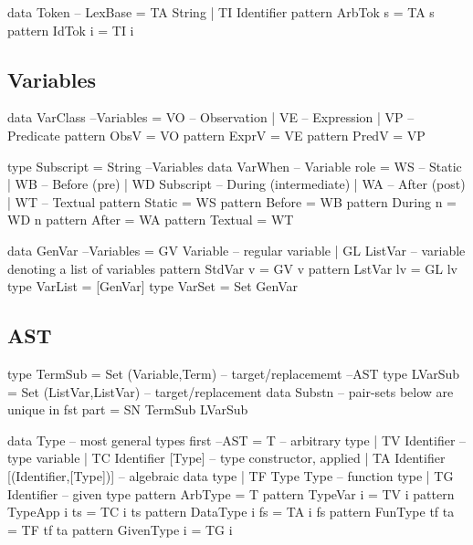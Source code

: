 \begin{code}
data Token                                                         -- LexBase
 = TA String
 | TI Identifier
pattern ArbTok s = TA s
pattern IdTok i = TI i
\end{code}

\subsection{Variables}

\begin{code}
data VarClass                                                     --Variables
  = VO -- Observation
  | VE -- Expression
  | VP -- Predicate
pattern ObsV  = VO
pattern ExprV = VE
pattern PredV = VP
\end{code}

\begin{code}
type Subscript = String                                           --Variables
data VarWhen -- Variable role
  = WS            --  Static
  | WB            --  Before (pre)
  | WD Subscript  --  During (intermediate)
  | WA            --  After (post)
  | WT            --  Textual
pattern Static    =  WS
pattern Before    =  WB
pattern During n  =  WD n
pattern After     =  WA
pattern Textual   =  WT
\end{code}

\begin{code}
data GenVar                                                        --Variables
 = GV Variable -- regular variable
 | GL ListVar  -- variable denoting a list of variables
pattern StdVar v = GV v
pattern LstVar lv = GL lv
type VarList = [GenVar]
type VarSet = Set GenVar
\end{code}


\subsection{AST}

\begin{code}
type TermSub = Set (Variable,Term) -- target/replacememt                --AST
type LVarSub = Set (ListVar,ListVar) -- target/replacement
data Substn --  pair-sets below are unique in fst part
  = SN TermSub LVarSub
\end{code}

\begin{code}
data Type -- most general types first                                   --AST
 = T  -- arbitrary type
 | TV Identifier -- type variable
 | TC Identifier [Type] -- type constructor, applied
 | TA Identifier [(Identifier,[Type])] -- algebraic data type
 | TF Type Type -- function type
 | TG Identifier -- given type
pattern ArbType = T
pattern TypeVar i  = TV i
pattern TypeApp i ts = TC i ts
pattern DataType i fs = TA i fs
pattern FunType tf ta = TF tf ta
pattern GivenType i = TG i
\end{code}


